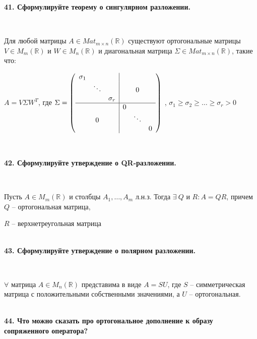 \documentclass{article}
\begin{document}
	\textbf{41. Сформулируйте теорему о сингулярном разложении.}
	
	{
		$\;$
		\setlength{\parindent}{0.4cm}
		\hangindent=0.4cm
		
		Для любой матрицы $A \in Mat_{m \times n}(\mathbb{R})$ существуют ортогональные матрицы $V \in M_m(\mathbb{R})$ и $W \in M_n(\mathbb{R})$ и диагональная матрица $\Sigma \in Mat_{m \times n}(\mathbb{R})$, такие что:
		
		\begin{center}
		$
		A = V\Sigma W^T
		$, где 
		$\Sigma = \left(
		\begin{array}{ccc|ccc}
		\sigma_1 &&&&& \\
		& \ddots &&&0& \\
		&& \sigma_r &&& \\
		\hline	
		&&&0&& \\
		&0&&&\ddots & \\
		&&&&&0
		\end{array} \right)
		$ , $\sigma_1 \ge \sigma_2 \ge \ldots \ge \sigma_r > 0$
		
		\end{center}
		
		$\;$
		\setlength{\parindent}{0cm}
		\hangindent=0cm
	}

	\textbf{42. Сформулируйте утверждение о QR-разложении.}
	
	{
		$\;$
		\setlength{\parindent}{0.4cm}
		\hangindent=0.4cm
		
		Пусть $A\in M_m(\mathbb{R})$ и столбцы $A_1, \ldots, A_m$ л.н.з. Тогда $\exists\ Q$ и $R:A=QR$, причем $Q$ -- ортогональная матрица, 
		
		$R$ -- верхнетреугольная матрица\\
		
		$\;$
		\setlength{\parindent}{0cm}
		\hangindent=0cm
	}

	\textbf{43. Сформулируйте утверждение о полярном разложении.}
	
	{
		$\;$
		\setlength{\parindent}{0.4cm}
		\hangindent=0.4cm
		
		$\forall$ матрица $A\in M_n(\mathbb{R})$ представима в виде $A=SU$, где $S$ -- симметрическая матрица с положительными собственными значениями, а $U$ -- ортогональная.\\
		
		$\;$
		\setlength{\parindent}{0cm}
		\hangindent=0cm
	}

	\textbf{44. Что можно сказать про ортогональное дополнение к образу сопряженного оператора?}
	
\end{document}
